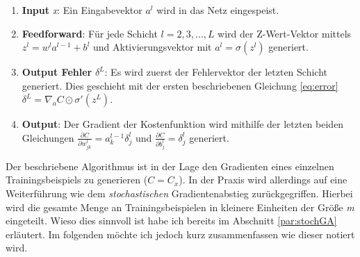 \begin{enumerate}

\item \textbf{Input} \emph{x}: Ein Eingabevektor $a^l$ wird in das Netz eingespeist.

\item \textbf{Feedforward}: Für jede Schicht $l = 2, 3, \ldots, L$ wird der Z-Wert-Vektor mittels $z^{l} = w^l a^{l-1}+b^l$ und Aktivierungsvektor mit $a^{l} = \sigma(z^{l})$ generiert.

\item \textbf{Output Fehler} $\delta^L$: Es wird zuerst der Fehlervektor der letzten Schicht generiert. Dies geschieht mit der ersten beschriebenen Gleichung \ref{eq:error} $\delta^{L}  = \nabla_a C \odot \sigma'(z^L)$.

\item \textbf{Output}: Der Gradient der Kostenfunktion wird mithilfe der letzten beiden Gleichungen $\frac{\partial C}{\partial w^l_{jk}} = a^{l-1}_k \delta^l_j$ und $\frac{\partial C}{\partial b^l_j} = \delta^l_j$ generiert.

\end{enumerate}

Der beschriebene Algorithmus ist in der Lage den Gradienten eines einzelnen Trainingsbeispiels zu generieren ($C=C_x$). In der Praxis wird allerdings auf eine Weiterführung wie dem \emph{stochastischen} Gradientenabstieg zurückgegriffen. Hierbei wird die gesamte Menge an Trainingsbeispielen in kleinere Einheiten der Größe \emph{m} eingeteilt. Wieso dies sinnvoll ist habe ich bereits im Abschnitt \ref{par:stochGA} erläutert. Im folgenden möchte ich jedoch kurz zusammenfassen wie dieser notiert wird.


